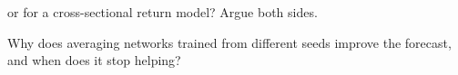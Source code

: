 \begin{interviewq}\label{iq:ml:neural-networks-for-noisy-tabular-data:5}
 or  for a cross-sectional return model? Argue both sides.
\end{interviewq}

\begin{interviewq}\label{iq:ml:neural-networks-for-noisy-tabular-data:6}
Why does averaging networks trained from different seeds improve the forecast, and when does it stop helping?
\end{interviewq}
